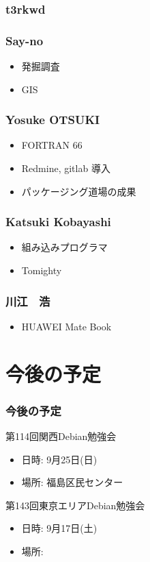 \documentclass[cjk,dvipdfmx,10pt,compress,%
hyperref={bookmarks=true,bookmarksnumbered=true,bookmarksopen=false,%
colorlinks=false,%
pdftitle={第 113 回 関西 Debian 勉強会},%
pdfauthor={倉敷・のがた・佐々木・かわだ},%
pdfsubject={資料},%
}]{beamer}
\begin{document}
\begin{frame}
  \frametitle{ t3rkwd }
\end{frame}

\begin{frame}
  \frametitle{ Say-no }
  \begin{itemize}
  \item 発掘調査
  \item GIS
  \end{itemize}
\end{frame}

\begin{frame}
  \frametitle{ Yosuke OTSUKI }
  \begin{itemize}
  \item FORTRAN 66
  \item Redmine, gitlab 導入
  \item パッケージング道場の成果
  \end{itemize}
\end{frame}

\begin{frame}
  \frametitle{ Katsuki Kobayashi }
  \begin{itemize}
  \item 組み込みプログラマ
  \item Tomighty
  \end{itemize}
\end{frame}

\begin{frame}
  \frametitle{ 川江　浩 }
  \begin{itemize}
  \item HUAWEI Mate Book
  \end{itemize}
\end{frame}




\section{今後の予定}
\begin{frame}[fragile]
  \frametitle{今後の予定}

  \begin{block}{第114回関西Debian勉強会}
    \begin{itemize}
    \item 日時: 9月25日(日)
    \item 場所: 福島区民センター
    \end{itemize}
  \end{block}

  \begin{block}{第143回東京エリアDebian勉強会}
    \begin{itemize}
    \item 日時: 9月17日(土)
    \item 場所:
    \end{itemize}
  \end{block}

\end{frame}

\takahashi[50]{  }
\end{document}
